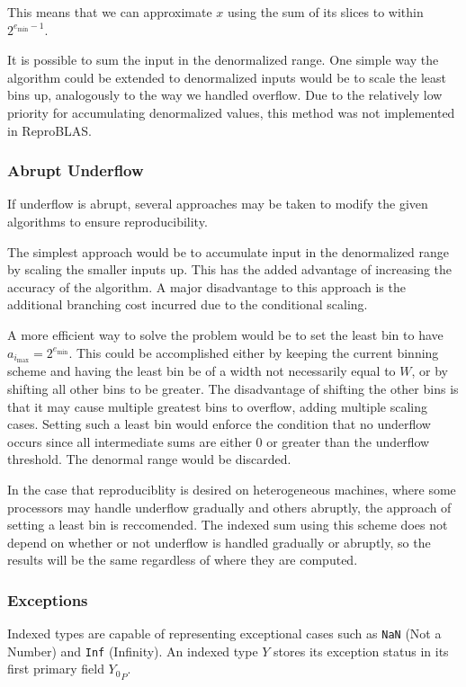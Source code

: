 \documentclass[12pt]{article}
\providecommand{\min}{\ensuremath{\text{min}}}
\providecommand{\max}{\ensuremath{\text{max}}}
\theoremstyle{definition}
\numberwithin{equation}{section}
\numberwithin{figure}{section}
\begin{document}
      This means that we can approximate $x$ using the sum of its slices to within $2^{e_{\min} - 1}$.

      It is possible to sum the input in the denormalized range. One simple way the algorithm could be extended to denormalized inputs would be to scale the least bins up, analogously to the way we handled overflow. Due to the relatively low priority for accumulating denormalized values, this method was not implemented in ReproBLAS.

    \subsubsection{Abrupt Underflow}
      \label{sec:indexed_underflow_abrupt}
      If underflow is abrupt, several approaches may be taken to modify the given algorithms to ensure reproducibility.

      The simplest approach would be to accumulate input in the denormalized range by scaling the smaller inputs up. This has the added advantage of increasing the accuracy of the algorithm. A major disadvantage to this approach is the additional branching cost incurred due to the conditional scaling.

      A more efficient way to solve the problem would be to set the least bin to have $a_{i_{\max}} = 2^{e_{\min}}$. This could be accomplished either by keeping the current binning scheme and having the least bin be of a width not necessarily equal to $W$, or by shifting all other bins to be greater. The disadvantage of shifting the other bins is that it may cause multiple greatest bins to overflow, adding multiple scaling cases. Setting such a least bin would enforce the condition that no underflow occurs since all intermediate sums are either $0$ or greater than the underflow threshold. The denormal range would be discarded.

    In the case that reproduciblity is desired on heterogeneous machines, where some processors may handle underflow gradually and others abruptly, the approach of setting a least bin is reccomended. The indexed sum using this scheme does not depend on whether or not underflow is handled gradually or abruptly, so the results will be the same regardless of where they are computed.

    \subsubsection{Exceptions}
      \label{sec:indexed_exceptions}
      Indexed types are capable of representing exceptional cases such as \texttt{NaN} (Not a Number) and \texttt{Inf} (Infinity). An indexed type $Y$ stores its exception status in its first primary field ${Y_0}_P$.
\end{document}

